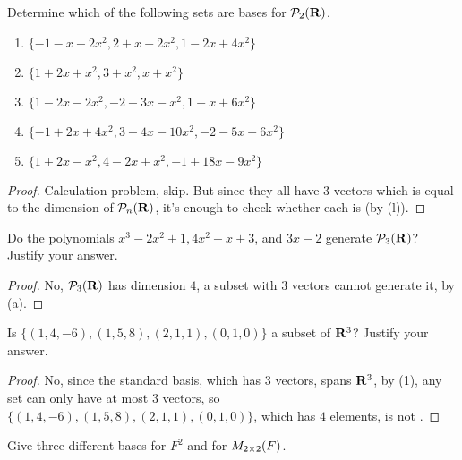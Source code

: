 \begin{exercise} \label{exercise 1.6.3}
Determine which of the following sets are bases for \(\mathcal{P}_2(\mathbf{R})\).
\begin{enumerate}
\item \(\{ -1 - x + 2x^2, 2 + x - 2x^2, 1 - 2x + 4x^2 \}\)
\item \(\{ 1 + 2x + x^2, 3 + x^2, x + x^2 \}\)
\item \(\{ 1 - 2x -2x^2, -2 + 3x - x^2, 1 - x + 6x^2 \}\)
\item \(\{ -1 + 2x + 4x^2, 3 - 4x - 10x^2, -2 - 5x - 6x^2 \}\)
\item \(\{ 1 + 2x - x^2, 4 - 2x + x^2, -1 + 18x - 9x^2 \}\)
\end{enumerate}
\end{exercise}

\begin{proof}
Calculation problem, skip.
But since they all have \(3\) vectors which is equal to the dimension of \(\mathcal{P}_n(\mathbf{R})\), it's enough to check whether each is \LID{} (by (l)).
\end{proof}

\begin{exercise} \label{exercise 1.6.4}
Do the polynomials \(x^3 - 2x^2 + 1, 4x^2 - x + 3\), and \(3x - 2\) generate \(\mathcal{P}_3(\mathbf{R})\)?
Justify your answer.
\end{exercise}

\begin{proof}
No, \(\mathcal{P}_3(\mathbf{R})\) has dimension \(4\), a subset with \(3\) vectors cannot generate it, by (a).
\end{proof}

\begin{exercise} \label{exercise 1.6.5}
Is \(\{ (1, 4, -6), (1, 5, 8), (2, 1, 1), (0, 1,0) \}\) a \LID{} subset of \(\mathbf{R}^3\)?
Justify your answer.
\end{exercise}

\begin{proof}
No, since the standard basis, which has \(3\) vectors, spans \(\mathbf{R}^3\), by (1), any \LID{} set can only have at most \(3\) vectors, so \(\{ (1, 4, -6), (1, 5, 8), (2, 1, 1), (0, 1,0) \}\), which has \(4\) elements, is not \LID{}.
\end{proof}

\begin{exercise} \label{exercise 1.6.6}
Give three different bases for \(F^2\) and for \(M_{2 \times 2}(F)\).
\end{exercise}

